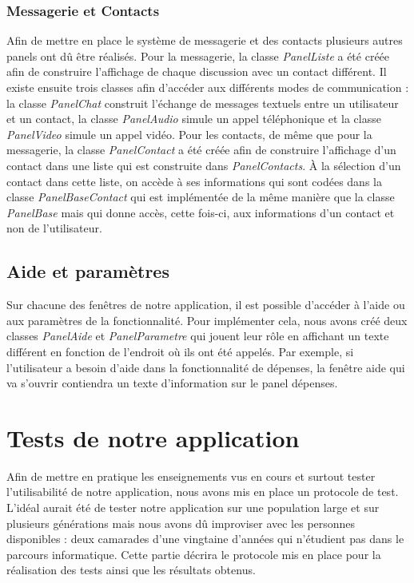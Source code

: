 \documentclass[11pt]{article}
\begin{document}
\subsubsection{Messagerie et Contacts}
Afin de mettre en place le système de messagerie et des contacts plusieurs autres panels ont dû être réalisés. Pour la messagerie, la classe \textit{PanelListe} a été créée afin de construire l'affichage de chaque discussion avec un contact différent. Il existe ensuite trois classes afin d'accéder aux différents modes de communication : la classe \textit{PanelChat} construit l'échange de messages textuels entre un utilisateur et un contact, la classe \textit{PanelAudio} simule un appel téléphonique et la classe \textit{PanelVideo} simule un appel vidéo. 
Pour les contacts, de même que pour la messagerie, la classe \textit{PanelContact} a été créée afin de construire l'affichage d'un contact dans une liste qui est construite dans \textit{PanelContacts}. À la sélection d'un contact dans cette liste, on accède à ses informations qui sont codées dans la classe \textit{PanelBaseContact} qui est implémentée de la même manière que la classe \textit{PanelBase} mais qui donne accès, cette fois-ci, aux informations d'un contact et non de l'utilisateur.
\subsection{Aide et paramètres}
Sur chacune des fenêtres de notre application, il est possible d'accéder à l'aide ou aux paramètres de la fonctionnalité. Pour implémenter cela, nous avons créé deux classes \textit{PanelAide} et \textit{PanelParametre} qui jouent leur rôle en affichant un texte différent en fonction de l'endroit où ils ont été appelés. Par exemple, si l'utilisateur a besoin d'aide dans la fonctionnalité de dépenses, la fenêtre aide qui va s'ouvrir contiendra un texte d'information sur le panel dépenses. 

\section{Tests de notre application}
Afin de mettre en pratique les enseignements vus en cours et surtout tester l'utilisabilité de notre application, nous avons mis en place un protocole de test. L'idéal aurait été de tester notre application sur une population large et sur plusieurs générations mais nous avons dû improviser avec les personnes disponibles : deux camarades d'une vingtaine d'années qui n'étudient pas dans le parcours informatique. Cette partie décrira le protocole mis en place pour la réalisation des tests ainsi que les résultats obtenus.
\end{document}
